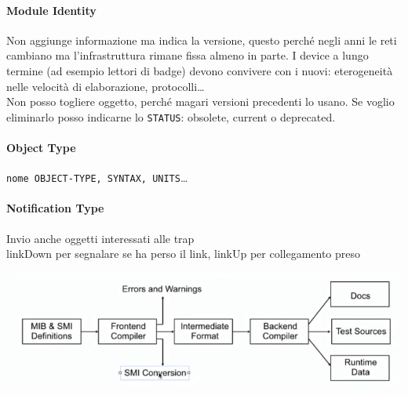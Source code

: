 \documentclass[10pt]{book}
\begin{document}
\paragraph{Module Identity} Non aggiunge informazione ma indica la versione, questo perché negli anni le reti cambiano ma l'infrastruttura rimane fissa almeno in parte. I device a lungo termine (ad esempio lettori di badge) devono convivere con i nuovi: eterogeneità nelle velocità di elaborazione, protocolli\ldots\\
Non posso togliere oggetto, perché magari versioni precedenti lo usano. Se voglio eliminarlo posso indicarne lo \texttt{STATUS}: obsolete, current o deprecated.
\paragraph{Object Type} \texttt{nome OBJECT-TYPE, SYNTAX, UNITS}\ldots
\paragraph{Notification Type} Invio anche oggetti interessati alle trap\\
linkDown per segnalare se ha perso il link, linkUp per collegamento preso
\begin{center}
	\includegraphics[scale=0.75]{mibcompiler.png}
\end{center}
\end{document}

